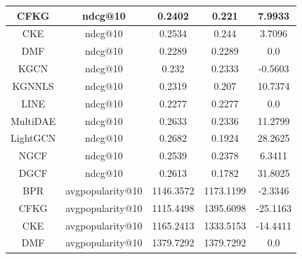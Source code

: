 \begin{table}[H]
{\begin{tabular}{|c|c|c|c|c|}
CFKG             & ndcg@10           & 0.2402                        & 0.221                            & 7.9933                               \\ \hline
CKE              & ndcg@10           & 0.2534                        & 0.244                            & 3.7096                               \\ \hline
DMF              & ndcg@10           & 0.2289                        & 0.2289                           & 0.0                                  \\ \hline
KGCN             & ndcg@10           & 0.232                         & 0.2333                           & -0.5603                              \\ \hline
KGNNLS           & ndcg@10           & 0.2319                        & 0.207                            & 10.7374                              \\ \hline
LINE             & ndcg@10           & 0.2277                        & 0.2277                           & 0.0                                  \\ \hline
MultiDAE         & ndcg@10           & 0.2633                        & 0.2336                           & 11.2799                              \\ \hline
LightGCN         & ndcg@10           & 0.2682                        & 0.1924                           & 28.2625                              \\ \hline
NGCF             & ndcg@10           & 0.2539                        & 0.2378                           & 6.3411                               \\ \hline
DGCF             & ndcg@10           & 0.2613                        & 0.1782                           & 31.8025                              \\ \hline
BPR              & avgpopularity@10 & 1146.3572                     & 1173.1199                        & -2.3346                              \\ \hline
CFKG             & avgpopularity@10 & 1115.4498                     & 1395.6098                        & -25.1163                             \\ \hline
CKE              & avgpopularity@10 & 1165.2413                     & 1333.5153                        & -14.4411                             \\ \hline
DMF              & avgpopularity@10 & 1379.7292                     & 1379.7292                        & 0.0                                  \\ \hline

\end{tabular}}
\end{table}
